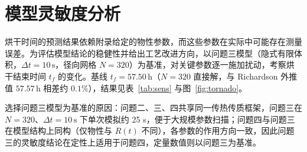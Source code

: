 \documentclass[withoutpreface,bwprint]{cumcmthesis} %
\begin{document}
\section{模型灵敏度分析}

烘干时间的预测结果依赖附录给定的物性参数，而这些参数在实际中可能存在测量误差。为评估模型结论的稳健性并给出工艺改进方向，以问题三模型（隐式有限体积，$\Delta t=10\,\mathrm{s}$，径向网格 $N=320$）为基准，对关键参数逐一施加扰动，考察烘干结束时间 $t_f$ 的变化。基线 $t_f=57.50\,\mathrm{h}$（$N=320$ 直接解，与 Richardson 外推值 $57.57\,\mathrm{h}$ 相差约 $0.1\%$），结果见表~\ref{tab:sens} 与图~\ref{fig:tornado}。

选择问题三模型为基准的原因：问题二、三、四共享同一传热传质框架，问题三在 $N=320$、$\Delta t=10\,\mathrm{s}$ 下单次模拟约 25 s，便于大规模参数扫描；问题四与问题三在模型结构上同构（仅物性与 $R(t)$ 不同），各参数的作用方向一致，因此问题三的灵敏度结论在定性上适用于问题四，定量数值则以问题三为基准。
\end{document}
